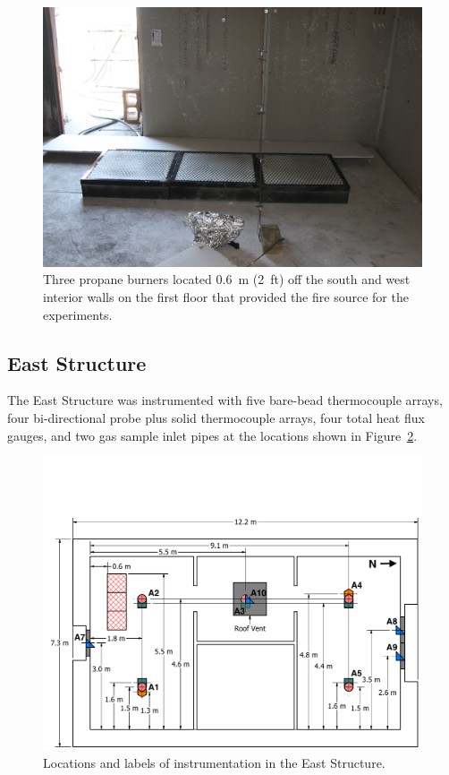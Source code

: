 \begin{figure}[!h]
	\centering
	\includegraphics[width=0.9\columnwidth]{Figures/Pictures/burners}
	\caption[Three propane burners used as the fuel source]{Three propane burners located 0.6~m (2~ft) off the south and west interior walls on the first floor that provided the fire source for the experiments.}
	\label{fig:burners}
\end{figure}

\subsection{East Structure}

The East Structure was instrumented with five bare-bead thermocouple arrays, four bi-directional probe plus solid thermocouple arrays, four total heat flux gauges, and two gas sample inlet pipes at the locations shown in Figure~\ref{fig:east_instrumentation}.

\begin{figure}[!h]
	\centering
	\includegraphics[width=\columnwidth]{Figures/Floor_Plans/East_Structure_Dimensioned_Instrumentation}
	\caption[Locations and labels of instrumentation in the East Structure]{Locations and labels of instrumentation in the East Structure.}
	\label{fig:east_instrumentation}
\end{figure}

